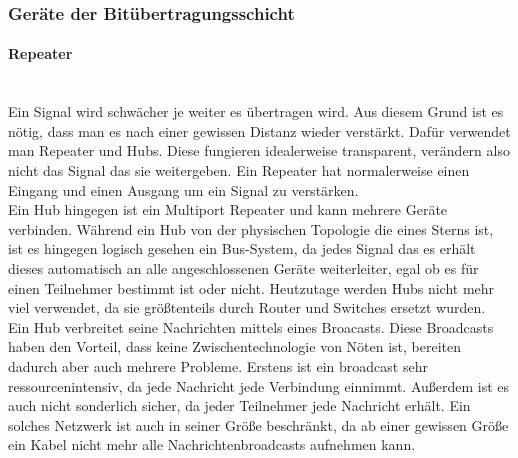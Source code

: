 \documentclass{article}
\newcommand{\paragraphlb}[1]{\paragraph{#1}\mbox{}\\}
\begin{document}
	 \subsubsection{Geräte der Bitübertragungsschicht}
	 \paragraphlb{Repeater}
	 Ein Signal wird schwächer je weiter es übertragen wird. Aus diesem Grund ist es nötig, dass man es nach einer gewissen Distanz wieder verstärkt. Dafür verwendet man Repeater und Hubs. Diese fungieren idealerweise transparent, verändern also nicht das Signal das sie weitergeben. Ein Repeater hat normalerweise einen Eingang und einen Ausgang um ein Signal zu verstärken. \\
	 Ein Hub hingegen ist ein Multiport Repeater und kann mehrere Geräte verbinden. Während ein Hub von der physischen Topologie die eines Sterns ist, ist es hingegen logisch gesehen ein Bus-System, da jedes Signal das es erhält dieses automatisch an alle angeschlossenen Geräte weiterleiter, egal ob es für einen Teilnehmer bestimmt ist oder nicht. Heutzutage werden Hubs nicht mehr viel verwendet, da sie größtenteils durch Router und Switches ersetzt wurden. \\
	 Ein Hub verbreitet seine Nachrichten mittels eines Broacasts. Diese Broadcasts haben den Vorteil, dass keine Zwischentechnologie von Nöten ist, bereiten dadurch aber auch mehrere Probleme. Erstens ist ein broadcast sehr ressourcenintensiv, da jede Nachricht jede Verbindung einnimmt. Außerdem ist es auch nicht sonderlich sicher, da jeder Teilnehmer jede Nachricht erhält. Ein solches Netzwerk ist auch in seiner Größe beschränkt, da ab einer gewissen Größe ein Kabel nicht mehr alle Nachrichtenbroadcasts aufnehmen kann. \\
\end{document}
